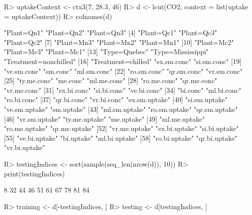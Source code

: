 \documentclass{article}\usepackage[]{graphicx}\usepackage[]{color}
\begin{document}
\begin{Schunk}
% --begin: "pbld2"
\begin{Sinput}
R> uptakeContext <- ctx3(7, 28.3, 46)
R> d <- lcut(CO2, context = list(uptake = uptakeContext))
R> colnames(d)
\end{Sinput}
\begin{Soutput}
 [1] "Plant=Qn1"            "Plant=Qn2"            "Plant=Qn3"           
 [4] "Plant=Qc1"            "Plant=Qc3"            "Plant=Qc2"           
 [7] "Plant=Mn3"            "Plant=Mn2"            "Plant=Mn1"           
[10] "Plant=Mc2"            "Plant=Mc3"            "Plant=Mc1"           
[13] "Type=Quebec"          "Type=Mississippi"     "Treatment=nonchilled"
[16] "Treatment=chilled"    "ex.sm.conc"           "si.sm.conc"          
[19] "ve.sm.conc"           "sm.conc"              "ml.sm.conc"          
[22] "ro.sm.conc"           "qr.sm.conc"           "vr.sm.conc"          
[25] "ty.me.conc"           "me.conc"              "ml.me.conc"          
[28] "ro.me.conc"           "qr.me.conc"           "vr.me.conc"          
[31] "ex.bi.conc"           "si.bi.conc"           "ve.bi.conc"          
[34] "bi.conc"              "ml.bi.conc"           "ro.bi.conc"          
[37] "qr.bi.conc"           "vr.bi.conc"           "ex.sm.uptake"        
[40] "si.sm.uptake"         "ve.sm.uptake"         "sm.uptake"           
[43] "ml.sm.uptake"         "ro.sm.uptake"         "qr.sm.uptake"        
[46] "vr.sm.uptake"         "ty.me.uptake"         "me.uptake"           
[49] "ml.me.uptake"         "ro.me.uptake"         "qr.me.uptake"        
[52] "vr.me.uptake"         "ex.bi.uptake"         "si.bi.uptake"        
[55] "ve.bi.uptake"         "bi.uptake"            "ml.bi.uptake"        
[58] "ro.bi.uptake"         "qr.bi.uptake"         "vr.bi.uptake"        
\end{Soutput}
%
% --end: "pbld2"
\end{Schunk}

\begin{Schunk}
% --begin: "pbld3"
\begin{Sinput}
R> testingIndices <- sort(sample(seq_len(nrow(d)), 10))
R> print(testingIndices)
\end{Sinput}
\begin{Soutput}
 [1]  8 32 44 46 51 61 67 78 81 84
\end{Soutput}
\begin{Sinput}
R> training <- d[-testingIndices, ]
R> testing <- d[testingIndices, ]
\end{Sinput}
%
% --end: "pbld3"
\end{Schunk}
\end{document}
